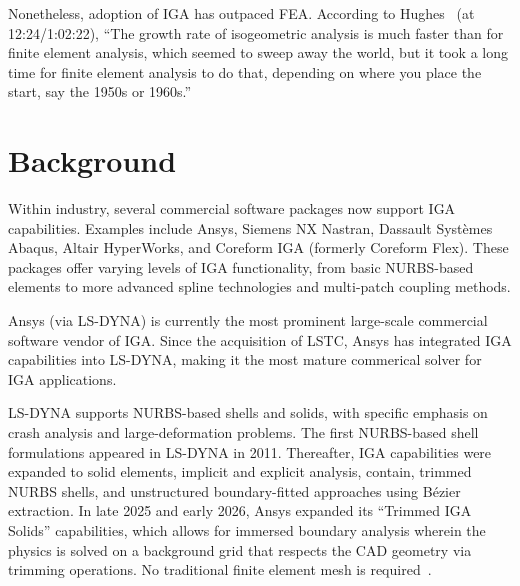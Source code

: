 \documentclass[12pt,report,justified]{SANDreport}
\begin{document}
Nonetheless, adoption of IGA has outpaced FEA.  According to Hughes~\cite{Hughes2022NCSU} (at 12:24/1:02:22), ``The growth rate of isogeometric analysis is much faster than for finite element analysis, which seemed to sweep away the world, but it took a long time for finite element analysis to do that, depending on where you place the start, say the 1950s or 1960s.''





%
%

\chapter{Background}

Within industry, several commercial software packages now support IGA capabilities.  Examples include Ansys, Siemens NX Nastran, Dassault Systèmes Abaqus, Altair HyperWorks, and Coreform IGA (formerly Coreform Flex).  These packages offer varying levels of IGA functionality, from basic NURBS-based elements to more advanced spline technologies and multi-patch coupling methods.

Ansys (via LS-DYNA) is currently the most prominent large-scale commercial software vendor of IGA.  Since the acquisition of LSTC, Ansys has integrated IGA capabilities into LS-DYNA, making it the most mature commerical solver for IGA applications.

LS-DYNA supports NURBS-based shells and solids, with specific emphasis on crash analysis and large-deformation problems.  The first NURBS-based shell formulations appeared in LS-DYNA in 2011.  Thereafter, IGA capabilities were expanded to solid elements, implicit and explicit analysis, contain, trimmed NURBS shells, and unstructured boundary-fitted approaches using B\'ezier extraction. In late 2025 and early 2026, Ansys expanded its ``Trimmed IGA Solids'' capabilities, which allows for immersed boundary analysis wherein the physics is solved on a background grid that respects the CAD geometry via trimming operations.  No traditional finite element mesh is required~\cite{Novozhilov2025}.
\end{document}
